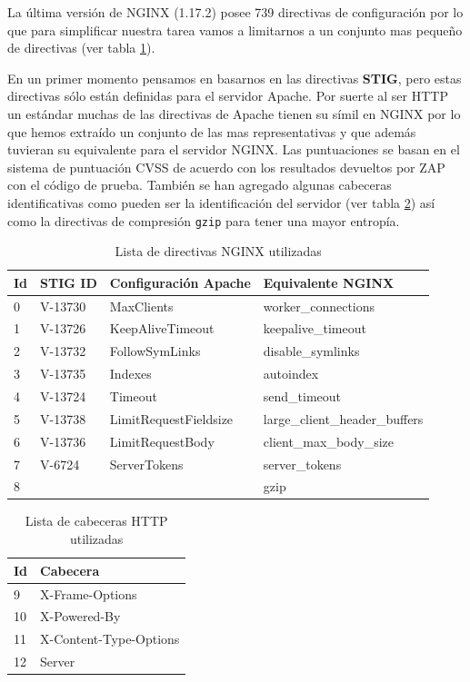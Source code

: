 La última versión de NGINX (1.17.2) posee 739 directivas de configuración por lo que para simplificar nuestra tarea vamos a limitarnos a un conjunto mas pequeño de directivas (ver tabla \ref{table:apache_nginx_directives}).

\bigskip
En un primer momento pensamos en basarnos en las directivas \textbf{STIG}, pero estas directivas sólo están definidas para el servidor Apache. Por suerte al ser HTTP un estándar muchas de las directivas de Apache tienen su símil en NGINX por lo que hemos extraído un conjunto de las mas representativas y que además tuvieran su equivalente para el servidor NGINX. Las puntuaciones se basan en el sistema de puntuación CVSS de acuerdo con los resultados devueltos por ZAP con el código de prueba. También se han agregado algunas cabeceras identificativas como pueden ser la identificación del servidor (ver tabla \ref{table:ngingx_headers}) así como la directivas de compresión \texttt{gzip} para tener una mayor entropía.

\begin{table}[H]
\begin{tabular}{|l|l|l|l|}
\hline
Id & STIG ID & Configuración Apache  & Equivalente NGINX              \\ \hline
0  & V-13730 & MaxClients            & worker\_connections            \\ \hline
1  & V-13726 & KeepAliveTimeout      & keepalive\_timeout             \\ \hline
2  & V-13732 & FollowSymLinks        & disable\_symlinks              \\ \hline
3  & V-13735 & Indexes               & autoindex                      \\ \hline
4  & V-13724 & Timeout               & send\_timeout                  \\ \hline
5  & V-13738 & LimitRequestFieldsize & large\_client\_header\_buffers \\ \hline
6  & V-13736 & LimitRequestBody      & client\_max\_body\_size        \\ \hline
7  & V-6724  & ServerTokens          & server\_tokens                 \\ \hline
8  &         &                       & gzip                           \\ \hline
\end{tabular}
\label{table:apache_nginx_directives}
\caption{Lista de directivas NGINX utilizadas}
\end{table}

\begin{table}[H]
\begin{tabular}{|l|l|}
\hline
Id & Cabecera                       \\ \hline
9  & X-Frame-Options                \\ \hline
10  & X-Powered-By                   \\ \hline
11 & X-Content-Type-Options         \\ \hline
12 & Server                         \\ \hline
\end{tabular}
\label{table:ngingx_headers}
\caption{Lista de cabeceras HTTP utilizadas}
\end{table}

